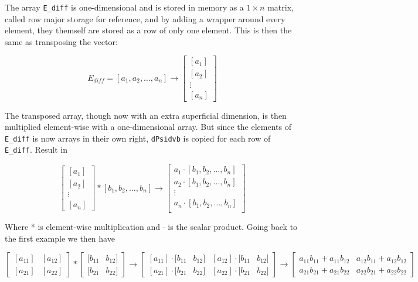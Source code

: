 The array \texttt{E_diff} is one-dimensional and is stored in memory as a $1 \times n$ matrix, called row major storage for reference, and by adding a wrapper around every element, they themself are stored as a row of only one element. This is then the same as transposing the vector:

$$E_{diff} = \left [a_1, a_2, \dots, a_n \right ] \rightarrow \begin{bmatrix}
    [a_1] \\ [a_2] \\ \vdots \\ [a_n]
\end{bmatrix}$$

The transposed array, though now with an extra superficial dimension, is then multiplied element-wise with a one-dimensional array. But since the elements of \texttt{E_diff} is now arrays in their own right, \texttt{dPsidvb} is copied for each row of \texttt{E_diff}. Result in

$$\begin{bmatrix}
    [a_1] \\ [a_2] \\ \vdots \\ [a_n]
  \end{bmatrix} * [b_1, b_2, \dots, b_n] \rightarrow \begin{bmatrix}
  a_1 \cdot [b_1, b_2, \dots, b_n] \\
  a_2 \cdot [b_1, b_2, \dots, b_n] \\
  \vdots \\
  a_n \cdot [b_1, b_2, \dots, b_n] \\
  \end{bmatrix}$$

Where * is element-wise multiplication and $\cdot$ is the scalar product. Going back to the first example we then have

$$\begin{bmatrix}
      [a_{11}] & [a_{12}] \\

     [a_{21}] & [a_{22}]
  \end{bmatrix}*\begin{bmatrix}
     [b_{11} & b_{12}]  \\

    [b_{21} & b_{22}]
  \end{bmatrix} \rightarrow \begin{bmatrix}
    [a_{ 11 }] \cdot [b_{11} & b_{12}] & [a_{12}] \cdot [b_{11} & b_{12}]  \\

    [a_{21}]\cdot[b_{21} & b_{22}] & [a_{22}] \cdot [b_{21} & b_{22}]
  \end{bmatrix} \rightarrow \begin{bmatrix}
    a_{11}b_{11} + a_{11}b_{12} & a_{12}b_{11} + a_{12}b_{12} \\
    a_{21}b_{21} + a_{21}b_{22} & a_{22}b_{21} + a_{22}b_{22}
  \end{bmatrix}$$

